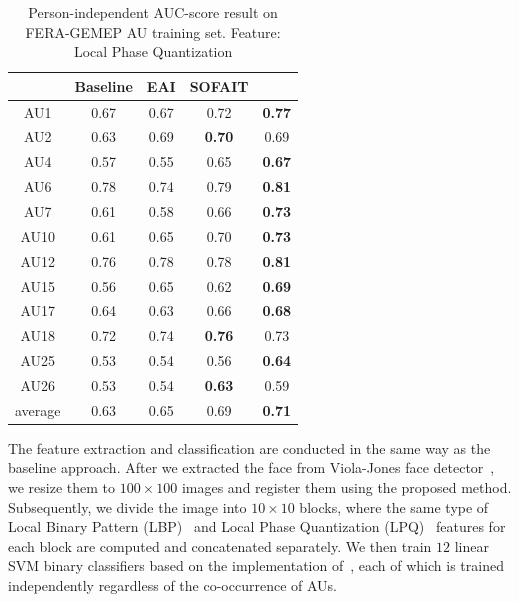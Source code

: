 \documentclass[10pt,journal]{IEEEtran}
\begin{document}
\begin{table}[htbp]
\caption{Person-independent AUC-score result on FERA-GEMEP AU training set. Feature: Local Phase Quantization}
\begin{center}
\label{table:fera_lpq}
\begin{tabular}{|c|cccc|}
\hline
& \pbox{10cm}{Baseline \\\cite{Valstar_FERA11}}	&\pbox{10cm}{EAI \\\cite{Yang_SMCB12}}	&\pbox{10cm}{SOFAIT \\\cite{Yang_FG13}}	&\pbox{10cm}{SOFIT}	\\ \hline
AU1		&0.67	&0.67	&0.72	&\textbf{0.77} \cellcolor[gray]{0.9}\cellcolor[gray]{0.9}	\\
AU2		&0.63	&0.69	&\textbf{0.70}\cellcolor[gray]{0.9}	&0.69	\\
AU4		&0.57	&0.55	&0.65	&\textbf{0.67}\cellcolor[gray]{0.9}	\\
AU6		&0.78	&0.74	&0.79	&\textbf{0.81}\cellcolor[gray]{0.9}	\\
AU7		&0.61	&0.58	&0.66	&\textbf{0.73}\cellcolor[gray]{0.9}	\\
AU10	&0.61	&0.65	&0.70	&\textbf{0.73}\cellcolor[gray]{0.9}	\\
AU12	&0.76	&0.78	&0.78	&\textbf{0.81}\cellcolor[gray]{0.9}	\\
AU15	&0.56	&0.65	&0.62	&\textbf{0.69}\cellcolor[gray]{0.9}	\\
AU17	&0.64	&0.63	&0.66	&\textbf{0.68}\cellcolor[gray]{0.9}	\\
AU18	&0.72	&0.74	&\textbf{0.76}\cellcolor[gray]{0.9}	&0.73	\\
AU25	&0.53	&0.54	&0.56	&\textbf{0.64}\cellcolor[gray]{0.9}	\\
AU26	&0.53	&0.54	&\textbf{0.63}\cellcolor[gray]{0.9}	&0.59	\\	\hline
average	&0.63	&0.65	&0.69	&\textbf{0.71}\cellcolor[gray]{0.9}	\\	\hline

\end{tabular}
\end{center}
\end{table}



The feature extraction and classification are conducted in the same way as the baseline approach. After we extracted the face from Viola-Jones face detector~\cite{Viola_IJCV04}, we resize them to $100\times100$ images and register them using the proposed method. Subsequently, we divide the image into $10\times10$ blocks, where the same type of Local Binary Pattern (LBP)~\cite{Ojala_PAMI02} and Local Phase Quantization (LPQ)~\cite{Ojansivu_ICISP08} features for each block are computed and concatenated separately. We then train $12$ linear SVM binary classifiers based on the implementation of~\cite{SVMlib}, each of which is trained independently regardless of the co-occurrence of AUs.
\end{document}
